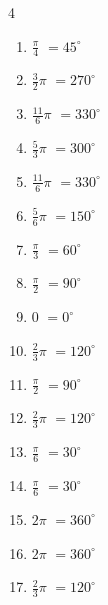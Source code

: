 \begin{multicols}{4}
\begin{enumerate}
  \item $\displaystyle \frac{\pi}{4}$
        $\displaystyle =45^{\circ}$

  \item $\displaystyle \frac{3}{2}\pi$
        $\displaystyle =270^{\circ}$

  \item $\displaystyle \frac{11}{6}\pi$
        $\displaystyle =330^{\circ}$

  \item $\displaystyle \frac{5}{3}\pi$
        $\displaystyle =300^{\circ}$

  \item $\displaystyle \frac{11}{6}\pi$
        $\displaystyle =330^{\circ}$

  \item $\displaystyle \frac{5}{6}\pi$
        $\displaystyle =150^{\circ}$

  \item $\displaystyle \frac{\pi}{3}$
        $\displaystyle =60^{\circ}$

  \item $\displaystyle \frac{\pi}{2}$
        $\displaystyle =90^{\circ}$

  \item $\displaystyle 0$
        $\displaystyle =0^{\circ}$

  \item $\displaystyle \frac{2}{3}\pi$
        $\displaystyle =120^{\circ}$

  \item $\displaystyle \frac{\pi}{2}$
        $\displaystyle =90^{\circ}$

  \item $\displaystyle \frac{2}{3}\pi$
        $\displaystyle =120^{\circ}$

  \item $\displaystyle \frac{\pi}{6}$
        $\displaystyle =30^{\circ}$

  \item $\displaystyle \frac{\pi}{6}$
        $\displaystyle =30^{\circ}$

  \item $\displaystyle 2\pi$
        $\displaystyle =360^{\circ}$

\columnbreak %

  \item $\displaystyle 2\pi$
        $\displaystyle =360^{\circ}$

  \item $\displaystyle \frac{2}{3}\pi$
        $\displaystyle =120^{\circ}$


\end{enumerate}
\end{multicols}
